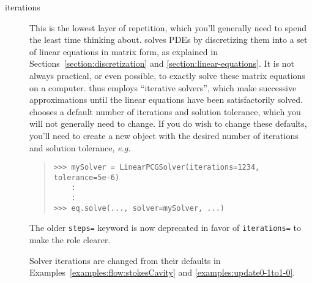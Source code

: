     \begin{description}
    
        \item[iterations] This is the lowest layer of repetition,
        which you'll generally need to spend the least time thinking
        about. \FiPy{} solves PDEs by discretizing them into a set of
        linear equations in matrix form, as explained in
        Sections~\ref{section:discretization} and
        \ref{section:linear-equations}. It is not always practical, or
        even possible, to exactly solve these matrix equations on a
        computer. \FiPy{} thus employs ``iterative solvers'', which
        make successive approximations until the linear equations have
        been satisfactorily solved. \FiPy{} chooses a default number
        of iterations and solution tolerance, which you will not
        generally need to change. If you do wish to change these
        defaults, you'll need to create a new  object
        with the desired number of iterations and solution tolerance,
        \emph{e.g.}
        \begin{quote}
\begin{verbatim}
>>> mySolver = LinearPCGSolver(iterations=1234, tolerance=5e-6) 
    : 
    :
>>> eq.solve(..., solver=mySolver, ...)
\end{verbatim}
    	\end{quote}
        \begin{reSTadmonition}[Note]
        The older  \verb+steps=+ keyword is now
        deprecated in favor of \verb+iterations=+ to make the role
        clearer.
        \end{reSTadmonition}
        Solver iterations are changed from their defaults in
        Examples~\ref{examples:flow:stokesCavity} and
        \ref{examples:update0-1to1-0}.
        

\end{description}

